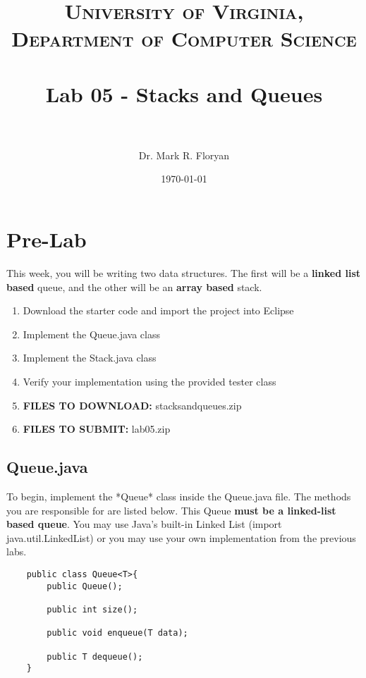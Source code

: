\documentclass[paper=a4, fontsize=11pt, parskip=full]{scrartcl} %
\title{	
\normalfont \normalsize 
\textsc{University of Virginia, Department of Computer Science} \\ [25pt] %
\horrule{0.5pt} \\[0.4cm] %
\huge Lab 05 - Stacks and Queues \\ %
\horrule{2pt} \\[0.5cm] %
}
\author{Dr. Mark R. Floryan} %
\date{\normalsize\today} %
\numberwithin{equation}{section} %
\numberwithin{figure}{section} %
\numberwithin{table}{section} %
\begin{document}
\maketitle %


\section{Pre-Lab}

This week, you will be writing two data structures. The first will be a \textbf{linked list based} queue, and the other will be an \textbf{array based} stack.

\begin{enumerate}
	\item Download the starter code and import the project into Eclipse
	\item Implement the Queue.java class
	\item Implement the Stack.java class
	\item Verify your implementation using the provided tester class
	\item \textbf{FILES TO DOWNLOAD:} stacksandqueues.zip
	\item \textbf{FILES TO SUBMIT:} lab05.zip
\end{enumerate}


\subsection{Queue.java}

To begin, implement the *Queue* class inside the Queue.java file. The methods you are responsible for are listed below. This Queue \textbf{must be a linked-list based queue}. You may use Java's built-in Linked List (import java.util.LinkedList) or you may use your own implementation from the previous labs.

\begin{lstlisting}
	public class Queue<T>{
		public Queue();

		public int size();

		public void enqueue(T data);

		public T dequeue();
	}
\end{lstlisting}
\end{document}
